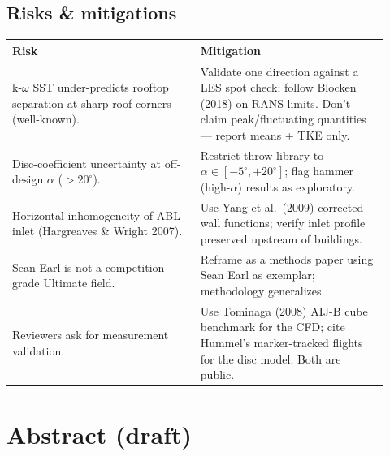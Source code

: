\documentclass[11pt,letterpaper]{article}
\begin{document}
\subsection{Risks \& mitigations}

\begin{center}
\footnotesize
\begin{tabular}{@{}p{0.46\linewidth}p{0.46\linewidth}@{}}
\toprule
\textbf{Risk} & \textbf{Mitigation} \\
\midrule
k-$\omega$ SST under-predicts rooftop separation at sharp roof corners (well-known). & Validate one direction against a LES spot check; follow Blocken (2018) on RANS limits. Don't claim peak/fluctuating quantities --- report means + TKE only. \\
Disc-coefficient uncertainty at off-design $\alpha$ ($>20^\circ$). & Restrict throw library to $\alpha \in [-5^\circ, +20^\circ]$; flag hammer (high-$\alpha$) results as exploratory. \\
Horizontal inhomogeneity of ABL inlet (Hargreaves \& Wright 2007). & Use Yang et al.\ (2009) corrected wall functions; verify inlet profile preserved upstream of buildings. \\
Sean Earl is not a competition-grade Ultimate field. & Reframe as a methods paper using Sean Earl as exemplar; methodology generalizes. \\
Reviewers ask for measurement validation. & Use Tominaga (2008) AIJ-B cube benchmark for the CFD; cite Hummel's marker-tracked flights for the disc model. Both are public. \\
\bottomrule
\end{tabular}
\end{center}

\section{Abstract (draft)}
\label{sec:abstract}
\end{document}
